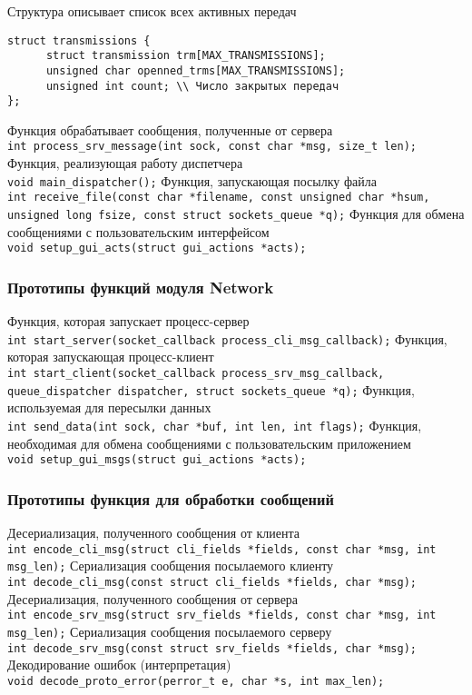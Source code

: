 \begin{appendix}
Структура описывает список всех активных передач
\begin{lstlisting}
struct transmissions {
      struct transmission trm[MAX_TRANSMISSIONS];
      unsigned char openned_trms[MAX_TRANSMISSIONS];
      unsigned int count; \\ Число закрытых передач
};
\end{lstlisting}

Функция обрабатывает сообщения, полученные от сервера\\
\texttt{int process\_srv\_message(int sock, const char *msg, size\_t len);}
\newpar
Функция, реализующая работу диспетчера\\
\texttt{void main\_dispatcher();}
\newpar
Функция, запускающая посылку файла\\
\texttt{int receive\_file(const char *filename, const
unsigned char *hsum, unsigned long fsize, const struct sockets\_queue *q);}
Функция для обмена сообщениями с пользовательским интерфейсом\\
\texttt{void setup\_gui\_acts(struct gui\_actions *acts);}
\subsubsection*{Прототипы функций модуля Network}
Функция, которая запускает процесс-сервер\\
\texttt{int start\_server(socket\_callback process\_cli\_msg\_callback);}
\newpar
Функция, которая запускающая процесс-клиент\\
\texttt{int start\_client(socket\_callback
process\_srv\_msg\_callback,
queue\_dispatcher dispatcher, struct sockets\_queue *q);}
\newpar
Функция, используемая для пересылки данных\\
\texttt{int send\_data(int sock, char *buf, int len, int flags);}
\newpar
Функция, необходимая для обмена сообщениями
с пользовательским приложением\\
\texttt{void setup\_gui\_msgs(struct gui\_actions *acts);}
\subsubsection*{Прототипы функция для обработки сообщений}
Десериализация, полученного сообщения от клиента\\
\texttt{int encode\_cli\_msg(struct cli\_fields *fields, const char *msg, int
msg\_len);}
\newpar
Сериализация сообщения посылаемого клиенту\\
\texttt{int decode\_cli\_msg(const struct cli\_fields *fields, char *msg);}
\newpar
Десериализация, полученного сообщения от сервера\\
\texttt{int encode\_srv\_msg(struct srv\_fields *fields, const char *msg, int
msg\_len);}
\newpar
Сериализация сообщения посылаемого серверу\\
\texttt{int decode\_srv\_msg(const struct srv\_fields *fields, char *msg);}
\newpar
Декодирование ошибок (интерпретация)\\
\texttt{void decode\_proto\_error(perror\_t e, char *s, int max\_len);}


\end{appendix}
